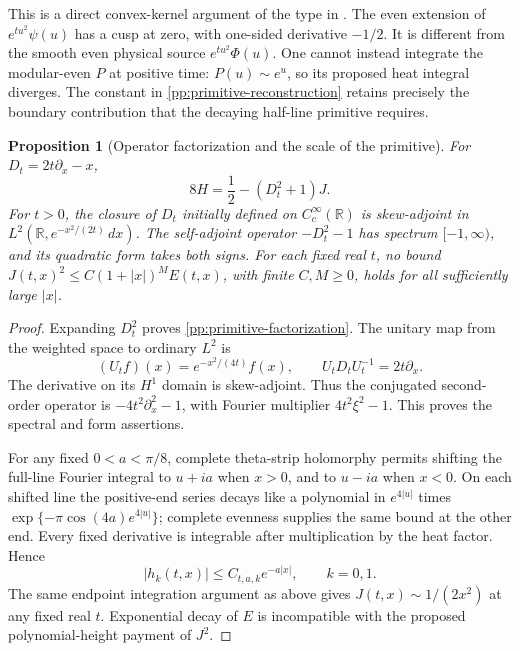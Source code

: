 \documentclass[11pt]{article}
\numberwithin{equation}{section}
\newtheorem{proposition}[theorem]{Proposition}
\theoremstyle{definition}
\theoremstyle{remark}
\newcommand{\R}{\mathbb R}
\newcommand{\dd}{\,d}
\begin{document}
This is a direct convex-kernel argument of the type in
\cite[Theorem~3.4]{csordas}. The even extension of
\(e^{tu^2}\psi(u)\) has a cusp at zero, with one-sided derivative
\(-1/2\). It is different from the smooth even physical source
\(e^{tu^2}\Phi(u)\). One cannot instead integrate the modular-even
\(P\) at positive time: \(P(u)\sim e^u\), so its proposed heat
integral diverges. The constant in
\eqref{pp:primitive-reconstruction} retains precisely the boundary
contribution that the decaying half-line primitive requires.

\begin{proposition}[Operator factorization and the scale of the primitive]
\label{pp:primitive-limitations}
For \(D_t=2t\partial_x-x\),
\begin{equation}
 8H=\frac12-(D_t^2+1)J.
 \label{pp:primitive-factorization}
\end{equation}
For \(t>0\), the closure of \(D_t\) initially defined on
\(C_c^\infty(\R)\) is skew-adjoint in
\(L^2(\R,e^{-x^2/(2t)}\dd x)\). The self-adjoint operator
\(-D_t^2-1\) has spectrum \([-1,\infty)\), and its quadratic
form takes both signs. For each fixed real \(t\), no bound
\(J(t,x)^2\le C(1+|x|)^M E(t,x)\), with finite
\(C,M\ge0\), holds for all sufficiently large \(|x|\).
\end{proposition}
\begin{proof}
Expanding \(D_t^2\) proves
\eqref{pp:primitive-factorization}. The unitary map from the weighted
space to ordinary \(L^2\) is
\[
 (U_tf)(x)=e^{-x^2/(4t)}f(x),\qquad
 U_tD_tU_t^{-1}=2t\partial_x.
\]
The derivative on its \(H^1\) domain is skew-adjoint. Thus the
conjugated second-order operator is
\(-4t^2\partial_x^2-1\), with Fourier multiplier
\(4t^2\xi^2-1\). This proves the spectral and form assertions.

For any fixed \(0<a<\pi/8\), complete theta-strip holomorphy
permits shifting the full-line Fourier integral to
\(u+ia\) when \(x>0\), and to \(u-ia\) when \(x<0\).
On each shifted line the positive-end series decays like a polynomial
in \(e^{4|u|}\) times
\(\exp\{-\pi\cos(4a)e^{4|u|}\}\); complete evenness supplies
the same bound at the other end. Every fixed derivative is integrable
after multiplication by the heat factor. Hence
\[
 |h_k(t,x)|\le C_{t,a,k}e^{-a|x|},\qquad k=0,1.
\]
The same endpoint integration argument as above gives
\(J(t,x)\sim1/(2x^2)\) at any fixed real \(t\).
Exponential decay of \(E\) is incompatible with the proposed
polynomial-height payment of \(J^2\).
\end{proof}
\end{document}

